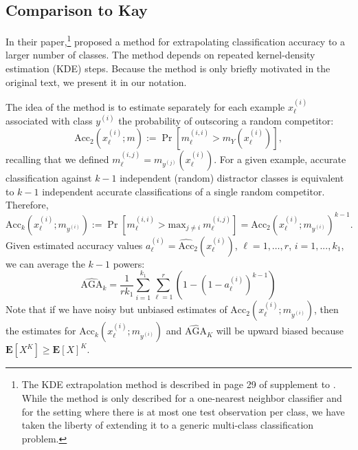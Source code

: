 \documentclass[twoside,11pt]{article}
\newcommand{\E}{\textbf{E}}
\begin{document}
\subsection{Comparison to Kay}

\label{sec:KDEcomparison}
In their paper,\footnote{The KDE extrapolation method is described in page 29 of supplement to \cite{Kay2008a}.  While the method is only described for
a one-nearest neighbor classifier and for the setting where there is at most
one test observation per class, we have taken the liberty of extending it to a generic multi-class classification problem.}
\cite{Kay2008a} proposed a method for extrapolating classification
accuracy to a larger number of classes. The method depends on repeated
kernel-density estimation (KDE) steps. Because the method is only
briefly motivated in the original text, we present it in our
notation. 

The idea of the method is to estimate separately for each example $x_\ell^{(i)}$ associated with class $y^{(i)}$ the probability of outscoring a random competitor:  
\[\mathrm{Acc}_2 (x_\ell^{(i)}; m) := \Pr[ m_\ell^{(i,i)} > m_Y (x_\ell^{(i)})],\]
recalling that we defined $m_\ell^{(i,j)} = m_{y^{(j)}}(x_\ell^{(i)})$.
For a given example, accurate classification against $k-1$ independent (random) distractor classes 
is equivalent to $k-1$ independent accurate classifications of a single random competitor. Therefore, 
\[\mathrm{Acc}_k (x_\ell^{(i)} ; m_{y^{(i)}}) := \Pr[ m_\ell^{(i,i)} > \mbox{max}_{j \neq i}\ m_\ell^{(i,j)} ] = \mathrm{Acc}_2(x_\ell^{(i)}; m_{y^{(i)}})^{k-1}. \]
Given estimated accuracy values $a_\ell^{(i)} = \widehat{\mathrm{Acc}}_2 (x_\ell^{(i)})$, $\ell =1,\hdots, r$, $i = 1,...,k_1$, 
we can average the $k-1$ powers:
\[\widehat{\mathrm{AGA}}_k  = \frac{1}{rk_1} \sum_{i = 1}^{k_1} \sum_{\ell=1}^r (1-(1-a_\ell^{(i)})^{k-1}) \]
Note that if we have noisy but unbiased estimates of $\mathrm{Acc}_2(x_\ell^{(i)} ; m_{y^{(i)}})$,
then the estimates for $\mathrm{Acc}_k(x_\ell^{(i)} ; m_{y^{(i)}})$ and $\widehat{\mathrm{AGA}}_K$ will be upward biased
because $\E[X^K] \geq \E[X]^K$.
 
\end{document}
